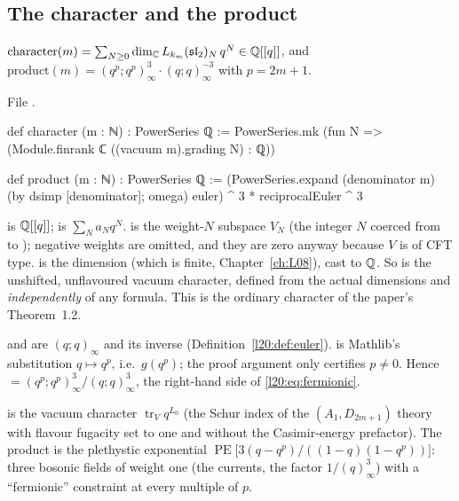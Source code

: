 \subsection{The character and the product}

\begin{definition}\label{l20:def:character}
$\mathrm{character}(m)=\sum_{N\ge0}\dim_{\mathbb{C}} L_{k_m}(\mathfrak{sl}_2)_N\,q^N\in{\mathbb{Q}}[[q]]$, and
$\mathrm{product}(m)=(q^p;q^p)_\infty^3\cdot(q;q)_\infty^{-3}$ with $p=2m+1$.
\end{definition}
\noindent File .
\begin{leancode}
def character (m : ℕ) : PowerSeries ℚ :=
  PowerSeries.mk (fun N => (Module.finrank ℂ ((vacuum m).grading N) : ℚ))

def product (m : ℕ) : PowerSeries ℚ :=
  (PowerSeries.expand (denominator m) (by dsimp [denominator]; omega) euler) ^ 3 *
    reciprocalEuler ^ 3
\end{leancode}

\begin{dictionary}
 is ${\mathbb{Q}}[[q]]$;  is $\sum_Na_Nq^N$.  is
the weight-$N$ subspace $V_N$ (the integer $N$ coerced from  to ); negative weights are
omitted, and they are zero anyway because $V$ is of CFT type.  is the dimension (which
is finite, Chapter~\ref{ch:L08}), cast to ${\mathbb{Q}}$. So  is the unshifted, unflavoured vacuum
character, defined from the actual dimensions and \emph{independently} of any formula. This is the
ordinary character of the paper's Theorem~1.2.

 and  are $(q;q)_\infty$ and its inverse (Definition~\ref{l20:def:euler}).
 is Mathlib's substitution $q\mapsto q^p$, i.e.\ $g(q^p)$; the proof
argument  only certifies $p\neq0$. Hence
 $=(q^p;q^p)^3_\infty/(q;q)^3_\infty$, the right-hand side of \eqref{l20:eq:fermionic}.
\end{dictionary}

\begin{physics}
 is the vacuum character $\operatorname{tr}_Vq^{L_0}$ (the Schur index of the
$(A_1,D_{2m+1})$ theory with flavour fugacity set to one and without the Casimir-energy prefactor). The
product is the plethystic exponential $\operatorname{PE}\bigl[3(q-q^p)/((1-q)(1-q^p))\bigr]$: three bosonic
fields of weight one (the currents, the factor $1/(q)^3_\infty$) with a ``fermionic'' constraint at every
multiple of $p$.
\end{physics}

